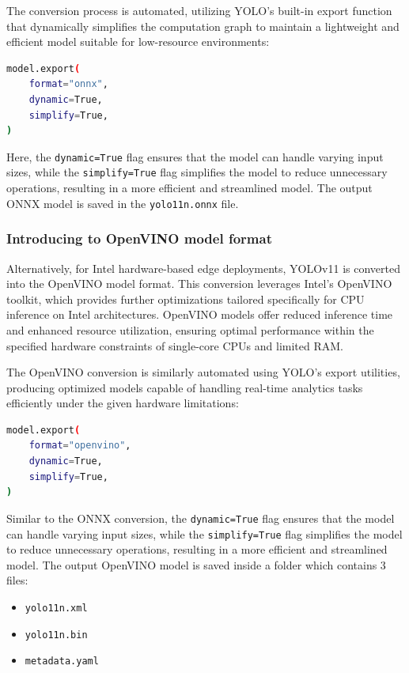 The conversion process is automated, utilizing YOLO's built-in export function that dynamically simplifies the computation graph to maintain a lightweight and efficient model suitable for low-resource environments:

\begin{lstlisting}[language=bash, caption={ONNX model conversion command}]
model.export(
    format="onnx",
    dynamic=True,
    simplify=True,
)
\end{lstlisting}

Here, the \texttt{dynamic=True} flag ensures that the model can handle varying input sizes, while the \texttt{simplify=True} flag simplifies the model to reduce unnecessary operations, resulting in a more efficient and streamlined model. The output ONNX model is saved in the \texttt{yolo11n.onnx} file.


\subsubsection{Introducing to OpenVINO model format}

Alternatively, for Intel hardware-based edge deployments, YOLOv11 is converted into the OpenVINO model format. This conversion leverages Intel's OpenVINO toolkit, which provides further optimizations tailored specifically for CPU inference on Intel architectures. OpenVINO models offer reduced inference time and enhanced resource utilization, ensuring optimal performance within the specified hardware constraints of single-core CPUs and limited RAM.

The OpenVINO conversion is similarly automated using YOLO's export utilities, producing optimized models capable of handling real-time analytics tasks efficiently under the given hardware limitations:


\begin{lstlisting}[language=bash, caption={OpenVINO model conversion command}]
model.export(
    format="openvino",
    dynamic=True,
    simplify=True,
)
\end{lstlisting}

Similar to the ONNX conversion, the \texttt{dynamic=True} flag ensures that the model can handle varying input sizes, while the \texttt{simplify=True} flag simplifies the model to reduce unnecessary operations, resulting in a more efficient and streamlined model. The output OpenVINO model is saved inside a folder which contains 3 files:
\begin{itemize}
    \item \texttt{yolo11n.xml}
    \item \texttt{yolo11n.bin}
    \item \texttt{metadata.yaml}
\end{itemize}


